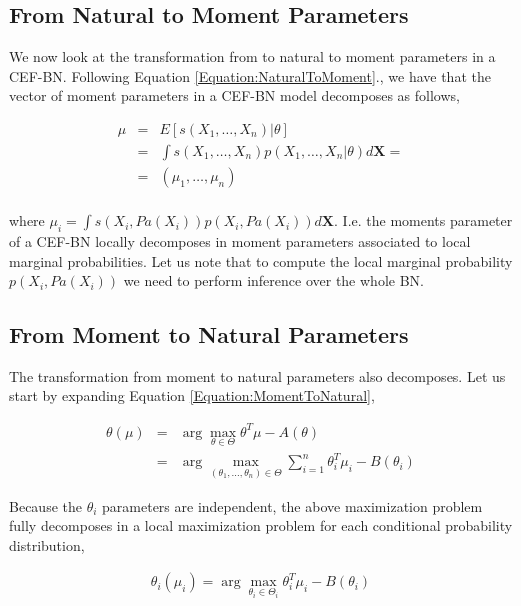 \documentclass[11pt, oneside]{article}   	%
\newcommand{\bm}{\mathbf}
\numberwithin{figure}{section}
\numberwithin{equation}{section}
\numberwithin{table}{section}
\newcommand{\e}[1]{E\left[ #1 \right]}
\theoremstyle{definition}
\begin{document}
\subsection{From Natural to Moment Parameters}
\label{Section:CEFBN:NaturalToMoment}

We now look at the transformation from to natural to moment parameters in a CEF-BN. Following Equation \ref{Equation:NaturalToMoment}., we have that the vector of moment parameters in a CEF-BN model decomposes as follows,

\begin{equation}
\begin{array}{lll}
\mu & = & \e{s(X_1,\ldots, X_n)|\theta} \\
&=& \int s(X_1,\ldots, X_n)p(X_1,\ldots, X_n|\theta) 
d\bm X = \\
&=& (\mu_1,\ldots,\mu_n) \\
\end{array}
\end{equation}

\noindent where $\mu_i= \int s(X_i,Pa(X_i)) p(X_i,Pa(X_i)) d\bm X$. I.e. the moments parameter of a CEF-BN locally decomposes in moment parameters associated to local marginal probabilities. Let us note that to compute the local marginal probability  $p(X_i,Pa(X_i))$ we need to perform inference over the whole BN.

\subsection{From Moment to Natural Parameters}
\label{Section:CEFBN:MomentToNatural}


The transformation from moment to natural parameters also decomposes. Let us start by expanding Equation \ref{Equation:MomentToNatural}, 

\begin{eqnarray}
\label{Equation:CEFBN_MomentToNatural}
\theta(\mu) &=& \arg\max_{\theta\in\Theta} \theta^T\mu
-A(\theta)\nonumber \\
&=& \arg\max_{(\theta_1,\ldots, \theta_n) \in\Theta} \sum_{i=1}^n \theta_i^T \mu_i - B(\theta_i) 
\end{eqnarray}

Because the $\theta_i$ parameters are independent, the above maximization problem fully decomposes in a local maximization problem for each conditional probability distribution,  

\begin{eqnarray}
\label{Equation:CEFBN_MomentToNaturalLocal}
\theta_i(\mu_i) = \arg\max_{\theta_i\in\Theta_i} \theta_i^T\mu_i - B(\theta_i)
\end{eqnarray}
\end{document}
